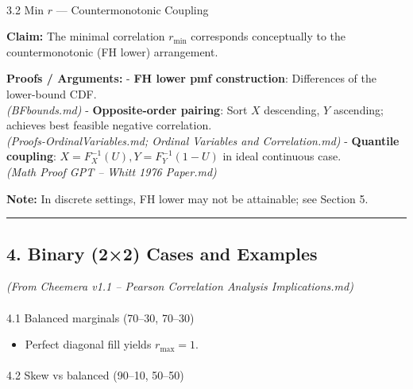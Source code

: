 \documentclass[
  letterpaper,
  DIV=11,
  numbers=noendperiod]{scrartcl}
\makeatletter
\let\oldparagraph\paragraph
\renewcommand{\paragraph}{
    \@ifstar
      \xxxParagraphStar
      \xxxParagraphNoStar
  }
\newcommand{\xxxParagraphStar}[1]{\oldparagraph*{#1}\mbox{}}
\newcommand{\xxxParagraphNoStar}[1]{\oldparagraph{#1}\mbox{}}
\providecommand{\tightlist}{%
  \setlength{\itemsep}{0pt}\setlength{\parskip}{0pt}}
\theoremstyle{remark}
\makeatother
\begin{document}
\paragraph{\texorpdfstring{3.2 Min \(r\) --- Countermonotonic
Coupling}{3.2 Min r --- Countermonotonic Coupling}}\label{min-r-countermonotonic-coupling}

\textbf{Claim:} The minimal correlation \(r_{\min}\) corresponds
conceptually to the countermonotonic (FH lower) arrangement.

\textbf{Proofs / Arguments:} - \textbf{FH lower pmf construction}:
Differences of the lower-bound CDF.\\
\emph{(BFbounds.md)} - \textbf{Opposite-order pairing}: Sort \(X\)
descending, \(Y\) ascending; achieves best feasible negative
correlation.\\
\emph{(Proofs-OrdinalVariables.md; Ordinal Variables and
Correlation.md)} - \textbf{Quantile coupling}:
\(X = F_X^{-1}(U), Y = F_Y^{-1}(1-U)\) in ideal continuous case.\\
\emph{(Math Proof GPT -- Whitt 1976 Paper.md)}

\textbf{Note:} In discrete settings, FH lower may not be attainable; see
Section 5.

\begin{center}\rule{0.5\linewidth}{0.5pt}\end{center}

\subsection{4. Binary (2×2) Cases and
Examples}\label{binary-22-cases-and-examples}

\emph{(From Cheemera v1.1 -- Pearson Correlation Analysis
Implications.md)}

\paragraph{4.1 Balanced marginals (70--30,
70--30)}\label{balanced-marginals-7030-7030}

\begin{itemize}
\tightlist
\item
  Perfect diagonal fill yields \(r_{\max} = 1\).
\end{itemize}

\paragraph{4.2 Skew vs balanced (90--10,
50--50)}\label{skew-vs-balanced-9010-5050}
\end{document}
